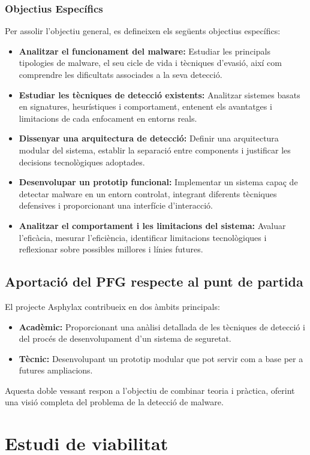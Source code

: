 \documentclass[12pt,a4paper]{report}
\begin{document}
\subsection{Objectius Específics}
Per assolir l'objectiu general, es defineixen els següents objectius específics:
\begin{itemize}
    \item \textbf{Analitzar el funcionament del malware:} Estudiar les principals tipologies de malware, el seu cicle de vida i tècniques d'evasió, així com comprendre les dificultats associades a la seva detecció.
    \item \textbf{Estudiar les tècniques de detecció existents:} Analitzar sistemes basats en signatures, heurístiques i comportament, entenent els avantatges i limitacions de cada enfocament en entorns reals.
    \item \textbf{Dissenyar una arquitectura de detecció:} Definir una arquitectura modular del sistema, establir la separació entre components i justificar les decisions tecnològiques adoptades.
    \item \textbf{Desenvolupar un prototip funcional:} Implementar un sistema capaç de detectar malware en un entorn controlat, integrant diferents tècniques defensives i proporcionant una interfície d'interacció.
    \item \textbf{Analitzar el comportament i les limitacions del sistema:} Avaluar l'eficàcia, mesurar l'eficiència, identificar limitacions tecnològiques i reflexionar sobre possibles millores i línies futures.
\end{itemize}

\section{Aportació del PFG respecte al punt de partida}
El projecte Asphylax contribueix en dos àmbits principals:
\begin{itemize}
    \item \textbf{Acadèmic:} Proporcionant una anàlisi detallada de les tècniques de detecció i del procés de desenvolupament d'un sistema de seguretat.
    \item \textbf{Tècnic:} Desenvolupant un prototip modular que pot servir com a base per a futures ampliacions.
\end{itemize}
Aquesta doble vessant respon a l'objectiu de combinar teoria i pràctica, oferint una visió completa del problema de la detecció de malware.


\chapter{Estudi de viabilitat}
\label{ch:viabilitat}
\end{document}
